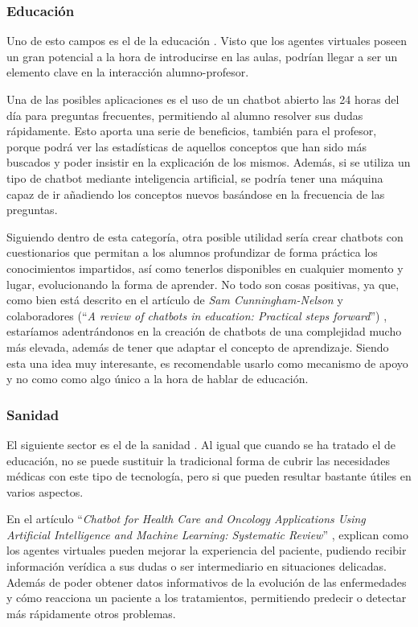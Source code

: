 \subsubsection{Educación}
Uno de esto campos es el de la educación \cite{cunningham2019review}. Visto que los agentes virtuales poseen un gran potencial a la hora de introducirse en las aulas, podrían llegar a ser un elemento clave en la interacción alumno-profesor.

Una de las posibles aplicaciones es el uso de un chatbot abierto las 24 horas del día para preguntas frecuentes, permitiendo al alumno resolver sus dudas rápidamente. Esto aporta una serie de beneficios, también para el profesor, porque podrá ver las estadísticas de aquellos conceptos que han sido más buscados y poder insistir en la explicación de los mismos. Además, si se utiliza un tipo de chatbot mediante inteligencia artificial, se podría tener una máquina capaz de ir añadiendo los conceptos nuevos basándose en la frecuencia de las preguntas.

Siguiendo dentro de esta categoría, otra posible utilidad sería crear chatbots con cuestionarios que permitan a los alumnos profundizar de forma práctica los conocimientos impartidos, así como tenerlos disponibles en cualquier momento y lugar, evolucionando la forma de aprender. No todo son cosas positivas, ya que, como bien está descrito en el artículo de \textit{Sam Cunningham-Nelson} y colaboradores (``\textit{A review of chatbots in education: Practical steps forward}'') \cite{cunningham2019review}, estaríamos adentrándonos en la creación de chatbots de una complejidad mucho más elevada, además de tener que adaptar el concepto de aprendizaje. Siendo esta una idea muy interesante, es recomendable usarlo como mecanismo de apoyo y no como como algo único a la hora de hablar de educación.

\subsubsection{Sanidad}
El siguiente sector es el de la sanidad \cite{xu2021chatbot}. Al igual que cuando se ha tratado el de educación, no se puede sustituir la tradicional forma de cubrir las necesidades médicas con este tipo de tecnología, pero si que pueden resultar bastante útiles en varios aspectos.

En el artículo ``\textit{Chatbot for Health Care and Oncology Applications Using Artificial Intelligence and Machine Learning: Systematic Review}'' \cite{xu2021chatbot}, explican como los agentes virtuales pueden mejorar la experiencia del paciente, pudiendo recibir información verídica a sus dudas o ser intermediario en situaciones delicadas. Además de poder obtener datos informativos de la evolución de las enfermedades y cómo reacciona un paciente a los tratamientos, permitiendo predecir o detectar más rápidamente otros problemas.

